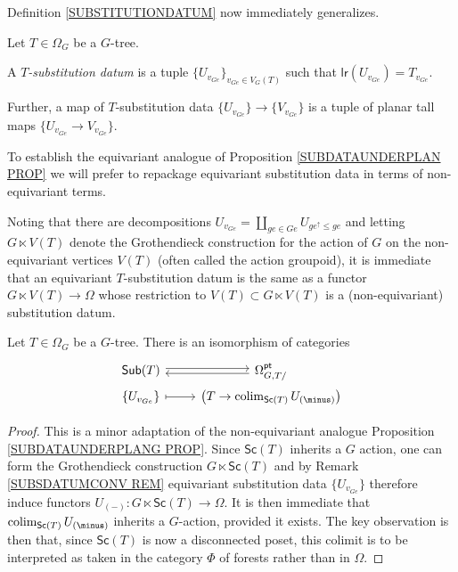 \documentclass[a4paper,10pt]{article}%
\begin{document}
Definition \ref{SUBSTITUTIONDATUM} now immediately generalizes.


\begin{definition}\label{SUBSTITUTIONDATUMG DEF}
	Let $T \in \Omega_G$ be a $G$-tree.
	
	A \textit{$T$-substitution datum} is a tuple 
	$\{U_{v_{G e}}\}_{v_{G e} \in V_G(T)}$ such that 
	$\mathsf{lr}(U_{v_{G e}}) = T_{v_{G e}}$.
	
	Further, a map of $T$-substitution data 
	$\{U_{v_{G e}}\} \to \{V_{v_{G e}}\}$ is a tuple of planar tall maps $\{U_{v_{G e}} \to V_{v_{G e}}\}$.
\end{definition}

\begin{remark}\label{SUBSDATUMCONV REM}
	To establish the equivariant analogue of Proposition \ref{SUBDATAUNDERPLAN PROP} we will prefer to repackage equivariant substitution data in terms of non-equivariant terms.

Noting that there are decompositions 
$U_{v_{G e}}= \coprod_{g e \in Ge} U_{ge^{\uparrow} \leq ge}$
and letting $G \ltimes V(T)$ denote the Grothendieck construction for the action of $G$ on the non-equivariant vertices $V(T)$ (often called the action groupoid), it is immediate that an equivariant $T$-substitution datum is the same as a functor $G \ltimes V(T) \to \Omega$ whose restriction to $V(T) \subset G \ltimes V(T)$ is a (non-equivariant) substitution datum.
\end{remark}


\begin{proposition}\label{SUBDATAUNDERPLANG PROP}
Let $T \in \Omega_G$ be a $G$-tree. There is an isomorphism of categories
\begin{equation}\label{SUBDATAUNDERPLANG EQ}
\begin{tikzcd}[row sep =0pt]
	\mathsf{Sub}(T) \ar[r,shift left=2pt] &
	\Omega_{G,T/}^{\mathsf{pt}} \ar[l,shift left=2pt]
\\
	\{U_{v_{G e}}\} \ar[r,mapsto] & 
	\left(T \to \colim_{\mathsf{Sc}(T)} U_{(\minus)}\right)
\end{tikzcd}
\end{equation}
\end{proposition}

\begin{proof}
	This is a minor adaptation of the non-equivariant analogue Proposition \ref{SUBDATAUNDERPLANG PROP}.
	Since $\mathsf{Sc}(T)$ inherits a $G$ action, one can form the Grothendieck construction $G \ltimes \mathsf{Sc}(T)$ and by Remark \ref{SUBSDATUMCONV REM} equivariant substitution data $\{U_{v_{Ge}}\}$ therefore induce functors 
	$U_{(\minus)} \colon G \ltimes \mathsf{Sc}(T) \to \Omega$.
	It is then immediate that $\colim_{\mathsf{Sc}(T)} U_{(\minus)}$ inherits a $G$-action, provided it exists. 
	The key observation is then that, since $\mathsf{Sc}(T)$ is now a disconnected poset, this colimit is to be interpreted as taken in the category $\Phi$ of forests rather than in $\Omega$.
\end{proof}
\end{document}
